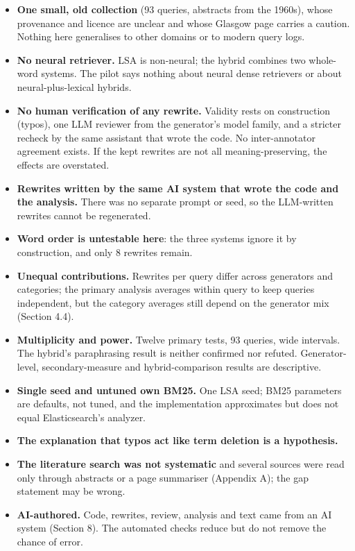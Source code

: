 \documentclass[
  11pt,
]{article}
\providecommand{\tightlist}{%
  \setlength{\itemsep}{0pt}\setlength{\parskip}{0pt}}
\begin{document}
\begin{itemize}
\tightlist
\item
  \textbf{One small, old collection} (93 queries, abstracts from the
  1960s), whose provenance and licence are unclear and whose Glasgow
  page carries a caution. Nothing here generalises to other domains or
  to modern query logs.
\item
  \textbf{No neural retriever.} LSA is non-neural; the hybrid combines
  two whole-word systems. The pilot says nothing about neural dense
  retrievers or about neural-plus-lexical hybrids.
\item
  \textbf{No human verification of any rewrite.} Validity rests on
  construction (typos), one LLM reviewer from the generator's model
  family, and a stricter recheck by the same assistant that wrote the
  code. No inter-annotator agreement exists. If the kept rewrites are
  not all meaning-preserving, the effects are overstated.
\item
  \textbf{Rewrites written by the same AI system that wrote the code and
  the analysis.} There was no separate prompt or seed, so the
  LLM-written rewrites cannot be regenerated.
\item
  \textbf{Word order is untestable here}: the three systems ignore it by
  construction, and only 8 rewrites remain.
\item
  \textbf{Unequal contributions.} Rewrites per query differ across
  generators and categories; the primary analysis averages within query
  to keep queries independent, but the category averages still depend on
  the generator mix (Section 4.4).
\item
  \textbf{Multiplicity and power.} Twelve primary tests, 93 queries,
  wide intervals. The hybrid's paraphrasing result is neither confirmed
  nor refuted. Generator-level, secondary-measure and hybrid-comparison
  results are descriptive.
\item
  \textbf{Single seed and untuned own BM25.} One LSA seed; BM25
  parameters are defaults, not tuned, and the implementation
  approximates but does not equal Elasticsearch's analyzer.
\item
  \textbf{The explanation that typos act like term deletion is a
  hypothesis.}
\item
  \textbf{The literature search was not systematic} and several sources
  were read only through abstracts or a page summariser (Appendix A);
  the gap statement may be wrong.
\item
  \textbf{AI-authored.} Code, rewrites, review, analysis and text came
  from an AI system (Section 8). The automated checks reduce but do not
  remove the chance of error.
\end{itemize}
\end{document}
